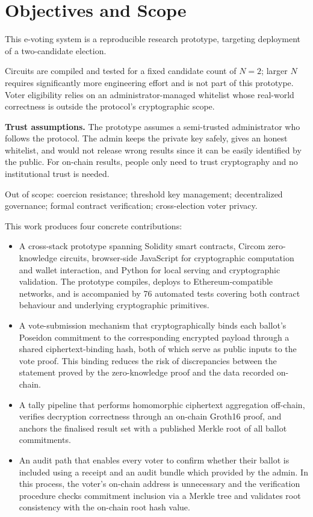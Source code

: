 \section{Objectives and Scope}

This e-voting system is a reproducible research prototype, targeting deployment of a two-candidate election.

Circuits are compiled and tested for a fixed candidate count of $N = 2$; larger $N$ requires significantly more engineering effort and is not part of this prototype. Voter eligibility relies on an administrator-managed whitelist whose real-world correctness is outside the protocol's cryptographic scope.

\textbf{Trust assumptions.} The prototype assumes a semi-trusted administrator who follows the protocol. The admin keeps the private key safely, gives an honest whitelist, and would not release wrong results since it can be easily identified by the public. For on-chain results, people only need to trust cryptography and no institutional trust is needed.

Out of scope: coercion resistance; threshold key management; decentralized governance; formal contract verification; cross-election voter privacy.

This work produces four concrete contributions:

\begin{itemize}
    \item A cross-stack prototype spanning Solidity smart contracts, Circom zero-knowledge circuits, browser-side JavaScript for cryptographic computation and wallet interaction, and Python for local serving and cryptographic validation. The prototype compiles, deploys to Ethereum-compatible networks, and is accompanied by 76 automated tests covering both contract behaviour and underlying cryptographic primitives.
    \item A vote-submission mechanism that cryptographically binds each ballot's Poseidon commitment to the corresponding encrypted payload through a shared ciphertext-binding hash, both of which serve as public inputs to the vote proof. This binding reduces the risk of discrepancies between the statement proved by the zero-knowledge proof and the data recorded on-chain.
    \item A tally pipeline that performs homomorphic ciphertext aggregation off-chain, verifies decryption correctness through an on-chain Groth16 proof, and anchors the finalised result set with a published Merkle root of all ballot commitments.
    \item An audit path that enables every voter to confirm whether their ballot is included using a receipt and an audit bundle which provided by the admin. In this process, the voter's on-chain address is unnecessary and the verification procedure checks commitment inclusion via a Merkle tree and validates root consistency with the on-chain root hash value.
\end{itemize}

